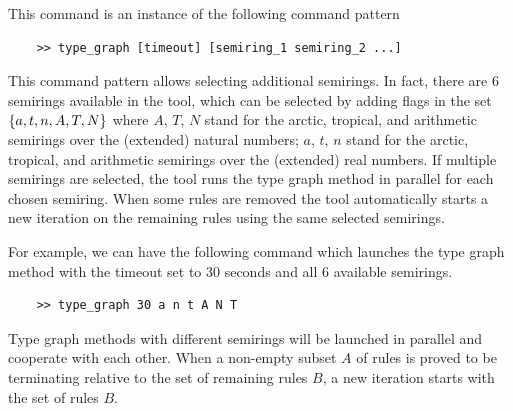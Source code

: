 This command is an instance of the following command pattern
\begin{lstlisting}
    >> type_graph [timeout] [semiring_1 semiring_2 ...]
\end{lstlisting}
This command pattern allows selecting additional semirings. In fact, there are 6 semirings available in the tool, which can be selected by adding flags in the set $\{a,t,n,A,T,N\}$ where $A$, $T$, $N$ stand for the arctic, tropical, and arithmetic semirings over the (extended) natural numbers;  $a$, $t$, $n$ stand for the arctic, tropical, and arithmetic semirings over the (extended) real numbers. If multiple semirings are selected, the tool runs the type graph method in parallel for each chosen semiring. When some rules are removed the tool automatically starts a new iteration on the remaining rules using the same selected semirings. 

For example, we can have the following command which launches the type graph method with the timeout set to 30 seconds and all 6 available semirings.
\begin{lstlisting} 
    >> type_graph 30 a n t A N T
\end{lstlisting}
Type graph methods with different semirings will be launched in parallel and cooperate with each other. When a non-empty subset $A$ of rules is proved to be terminating relative to the set of remaining rules $B$, a new iteration starts with the set of rules $B$.

